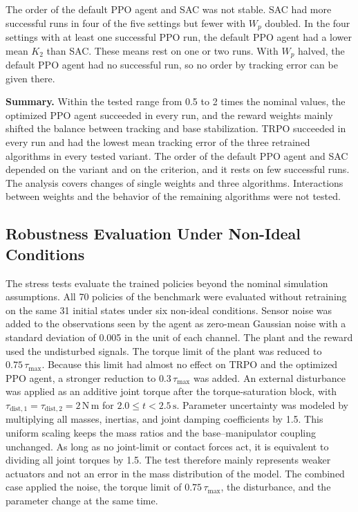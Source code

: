 \documentclass{ieeeaccess}
\begin{document}
The order of the default PPO agent and SAC was not stable. SAC had more successful runs in four of
the five settings but fewer with $W_p$ doubled. In the four settings with at least one successful
PPO run, the default PPO agent had a lower mean $K_2$ than SAC. These means rest on one or two runs.
With $W_p$ halved, the default PPO agent had no successful run, so no order by tracking error can be
given there.

\textbf{Summary.} Within the tested range from 0.5 to 2 times the nominal values, the optimized PPO agent
succeeded in every run, and the reward weights mainly shifted the balance between tracking and base
stabilization. TRPO succeeded in every run and had the lowest mean tracking error of the three retrained
algorithms in every tested variant. The order of the default PPO agent and SAC depended on the variant
and on the criterion, and it rests on few successful runs. The analysis covers changes of single weights
and three algorithms. Interactions between weights and the behavior of the remaining algorithms were not
tested.

\subsection{Robustness Evaluation Under Non-Ideal Conditions}\label{sec:robustness_eval}
The stress tests evaluate the trained policies beyond the nominal simulation assumptions. All 70 policies
of the benchmark were evaluated without retraining on the same 31 initial states under six non-ideal
conditions. Sensor noise was added to the observations seen by the agent as zero-mean Gaussian noise with
a standard deviation of 0.005 in the unit of each channel. The plant and the reward used the undisturbed
signals. The torque limit of the plant was reduced to $0.75\,\tau_{\max}$. Because this limit had almost no
effect on TRPO and the optimized PPO agent, a stronger reduction to $0.3\,\tau_{\max}$ was added. An external
disturbance was applied as an additive joint torque after the torque-saturation block, with
$\tau_{\mathrm{dist},1}=\tau_{\mathrm{dist},2}=2\,\mathrm{N\,m}$ for $2.0 \le t < 2.5\,\mathrm{s}$.
Parameter uncertainty was modeled by multiplying all masses, inertias, and joint damping coefficients by
1.5. This uniform scaling keeps the mass ratios and the base--manipulator coupling unchanged. As long as
no joint-limit or contact forces act, it is equivalent to dividing all joint torques by 1.5. The test
therefore mainly represents weaker actuators and not an error in the mass distribution of the model. The
combined case applied the noise, the torque limit of $0.75\,\tau_{\max}$, the disturbance, and the
parameter change at the same time.
\end{document}
